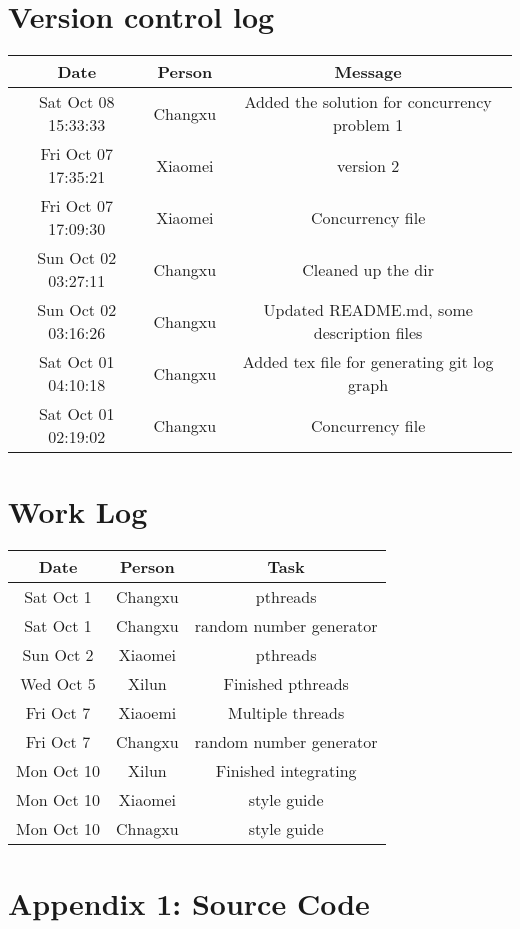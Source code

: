 \documentclass[letterpaper,10pt]{article}
\begin{document}
\section{Version control log}
\begin{tabular}{@{}ccc@{}}
    \toprule
    Date                & Person   & Message                                                   \\ \midrule
    Sat Oct 08 15:33:33 & Changxu  & Added the solution for concurrency problem 1              \\
    Fri Oct 07 17:35:21 & Xiaomei  & version 2                                                 \\
    Fri Oct 07 17:09:30 & Xiaomei  & Concurrency file                                          \\
    Sun Oct 02 03:27:11 & Changxu  & Cleaned up the dir                                        \\
    Sun Oct 02 03:16:26 & Changxu  & Updated README.md, some description files                 \\
    Sat Oct 01 04:10:18 & Changxu  & Added tex file for generating git log graph               \\
    Sat Oct 01 02:19:02 & Changxu  & Concurrency file                                          \\ \bottomrule
\end{tabular}

\section{Work Log}
\begin{tabular}{@{}ccc@{}}
    \toprule
    Date                & Person   & Task                                                      \\ \midrule
    Sat Oct 1           & Changxu  & pthreads                                                  \\
    Sat Oct 1           & Changxu  & random number generator                                   \\
    Sun Oct 2           & Xiaomei  & pthreads                                                  \\
    Wed Oct 5           & Xilun    & Finished pthreads                                         \\
    Fri Oct 7           & Xiaoemi  & Multiple threads                                          \\
    Fri Oct 7           & Changxu  & random number generator                                   \\
    Mon Oct 10          & Xilun    & Finished integrating                                      \\
    Mon Oct 10          & Xiaomei  & style guide                                               \\
    Mon Oct 10          & Chnagxu  & style guide                                               \\ \bottomrule
\end{tabular}

\newpage
\section*{Appendix 1: Source Code}

\end{document}
